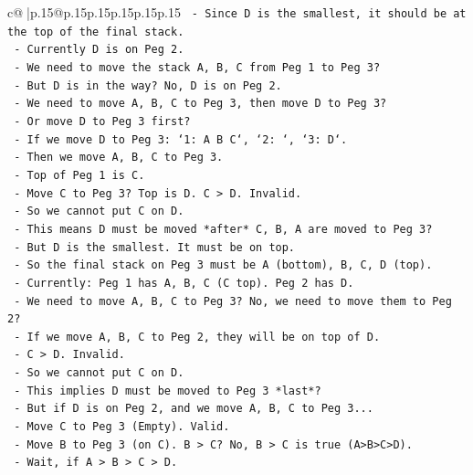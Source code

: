 \documentclass{article}
\begin{document}
{\begin{supertabular}{c@{$\;$}|p{.15\linewidth}@{}p{.15\linewidth}p{.15\linewidth}p{.15\linewidth}p{.15\linewidth}p{.15\linewidth}}
{{{\texttt{          {-} Since D is the smallest, it should be at the top of the final stack.} \\
\texttt{          {-} Currently D is on Peg 2.} \\
\texttt{          {-} We need to move the stack A, B, C from Peg 1 to Peg 3?} \\
\texttt{          {-} But D is in the way? No, D is on Peg 2.} \\
\texttt{          {-} We need to move A, B, C to Peg 3, then move D to Peg 3?} \\
\texttt{          {-} Or move D to Peg 3 first?} \\
\texttt{          {-} If we move D to Peg 3: `1: A B C`, `2: `, `3: D`.} \\
\texttt{          {-} Then we move A, B, C to Peg 3.} \\
\texttt{          {-} Top of Peg 1 is C.} \\
\texttt{          {-} Move C to Peg 3? Top is D. C > D. Invalid.} \\
\texttt{          {-} So we cannot put C on D.} \\
\texttt{          {-} This means D must be moved *after* C, B, A are moved to Peg 3?} \\
\texttt{          {-} But D is the smallest. It must be on top.} \\
\texttt{          {-} So the final stack on Peg 3 must be A (bottom), B, C, D (top).} \\
\texttt{          {-} Currently: Peg 1 has A, B, C (C top). Peg 2 has D.} \\
\texttt{          {-} We need to move A, B, C to Peg 3? No, we need to move them to Peg 2?} \\
\texttt{          {-} If we move A, B, C to Peg 2, they will be on top of D.} \\
\texttt{          {-} C > D. Invalid.} \\
\texttt{          {-} So we cannot put C on D.} \\
\texttt{          {-} This implies D must be moved to Peg 3 *last*?} \\
\texttt{          {-} But if D is on Peg 2, and we move A, B, C to Peg 3...} \\
\texttt{          {-} Move C to Peg 3 (Empty). Valid.} \\
\texttt{          {-} Move B to Peg 3 (on C). B > C? No, B > C is true (A>B>C>D).} \\
\texttt{          {-} Wait, if A > B > C > D.} \\
}}}
\end{supertabular}}
\end{document}

